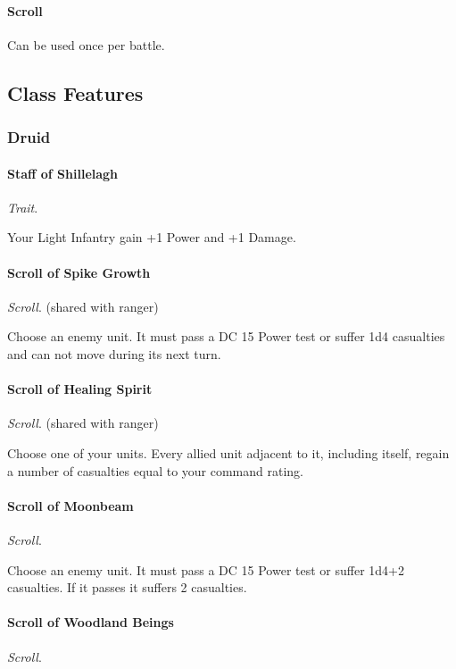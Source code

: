 \documentclass[letterpaper,twocolumn,openany,nodeprecatedcode]{dndbook}
\begin{document}
\paragraph{Scroll} Can be used once per battle.

\subsection{Class Features}

\subsubsection{Druid}

\paragraph{Staff of Shillelagh}
\textit{Trait}.

Your Light Infantry gain +1 Power and +1 Damage.

\paragraph{Scroll of Spike Growth}
\textit{Scroll}. (shared with ranger)

Choose an enemy unit.
It must pass a DC 15 Power test or suffer 1d4 casualties
and can not move during its next turn.

\paragraph{Scroll of Healing Spirit}
\textit{Scroll}. (shared with ranger)

Choose one of your units.
Every allied unit adjacent to it, including itself,
regain a number of casualties equal to your command rating.

\paragraph{Scroll of Moonbeam}
\textit{Scroll}.

Choose an enemy unit.
It must pass a DC 15 Power test or suffer 1d4+2 casualties.
If it passes it suffers 2 casualties.

\paragraph{Scroll of Woodland Beings}
\textit{Scroll}.
\end{document}
